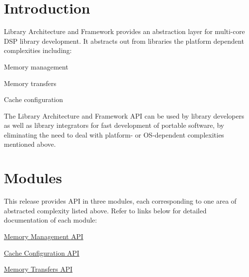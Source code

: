 \hypertarget{index_introduction}{}\section{Introduction}\label{index_introduction}
Library Architecture and Framework provides an abstraction layer for multi-\/core D\+S\+P library development. It abstracts out from libraries the platform dependent complexities including\+:
\begin{DoxyItemize}
\item Memory management
\item Memory transfers
\item Cache configuration
\end{DoxyItemize}

The Library Architecture and Framework A\+P\+I can be used by library developers as well as library integrators for fast development of portable software, by eliminating the need to deal with platform-\/ or O\+S-\/dependent complexities mentioned above.

\hypertarget{index_modules}{}\section{Modules}\label{index_modules}
This release provides A\+P\+I in three modules, each corresponding to one area of abstracted complexity listed above. Refer to links below for detailed documentation of each module\+:


\begin{DoxyItemize}
\item \hyperlink{group__libarch__memmgt}{Memory Management A\+P\+I}
\item \hyperlink{group__libarch__cachecfg}{Cache Configuration A\+P\+I}
\item \hyperlink{group__libarch__memtrans}{Memory Transfers A\+P\+I} 
\end{DoxyItemize}